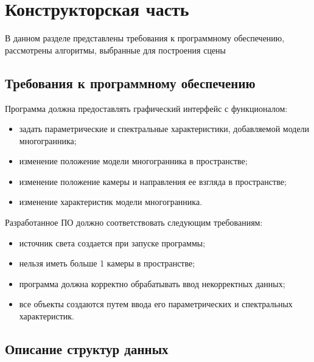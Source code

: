 \section{Конструкторская часть}
В данном разделе представлены требования к программному обеспечению, рассмотрены алгоритмы, выбранные для построения сцены

\subsection{Требования к программному обеспечению}

Программа должна предоставлять графический интерфейс с функционалом:
\begin{itemize}
	\item задать параметрические и спектральные характеристики, добавляемой модели многогранника;
	\item изменение положение модели многогранника в пространстве;
	\item изменение положение камеры и направления ее взгляда в пространстве;
	\item изменение характеристик модели многогранника.
\end{itemize}

Разработанное ПО должно соответствовать следующим требованиям:
\begin{itemize}
	\item источник света создается при запуске программы;
	\item нельзя иметь больше 1 камеры в пространстве;
	\item программа должна корректно обрабатывать ввод некорректных данных;
	\item все объекты создаются путем ввода его параметрических и спектральных характеристик.
\end{itemize}

\subsection{Описание структур данных}

